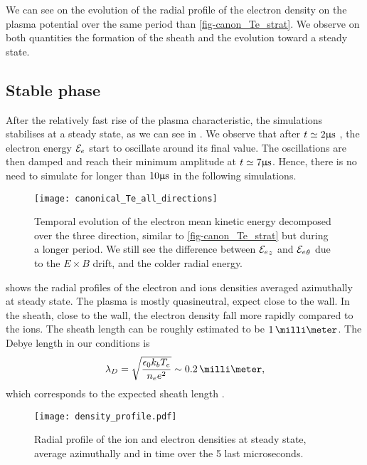   We can see on  the evolution of the radial profile of the electron density on the plasma potential over the same period than \cref{fig-canon_Te_strat}.
  We observe on both quantities the formation of the sheath and the evolution toward a steady state.
  
  \subsection{Stable phase} \label{subsec-stablephase}
  After the relatively fast rise of the plasma characteristic, the simulations stabilises at a steady state, as we can see in .
  We observe that after $t\simeq2\mathrm{\upmu s}$ , the electron energy ${\mathcal{E}_e}$ start to oscillate around its final value.
  The oscillations are then damped and reach their minimum amplitude at  $t\simeq 7\mathrm{\upmu s}$.
  Hence, there is no need to simulate for longer than $10\mathrm{\upmu s}$ in the following simulations.
  
  
  
  
  \begin{figure}[hbtp]
    \centering
    \texttt{[image: canonical\_Te\_all\_directions]}
    \caption{Temporal evolution of the electron mean kinetic energy decomposed over the three direction, similar to \cref{fig-canon_Te_strat} but during a longer period. We still see the difference between ${\mathcal{E}_e}_z$ and ${\mathcal{E}_e}_{\theta}$ due to the $E\times B$ drift, and the colder radial energy.}
    \label{fig-canon_Te_all}
  \end{figure}
  

   shows the radial profiles of the electron and ions densities averaged azimuthally at steady state.
  The plasma is mostly quasineutral, expect close to the wall.
  In the sheath, close to the wall, the electron density fall more rapidly compared to the ions.
  The sheath length can be roughly estimated to be $1\,\milli\meter$.
  The Debye length in our conditions is
  \begin{equation} \label{eq-debye}
    \lambda_D = \sqrt{\frac{\epsilon_0 k_b T_e}{n_e e^2}} \sim 0.2\,\milli\meter,
  \end{equation}
  which corresponds to the expected sheath length \citep{chabert2014}.
  
  \begin{figure}[hbtp]
    \centering
    \texttt{[image: density\_profile.pdf]}
    \caption{Radial profile of the ion and electron densities at steady state, average azimuthally and in time over the 5 last microseconds.}
    \label{fig-profiles}
  \end{figure}
  
